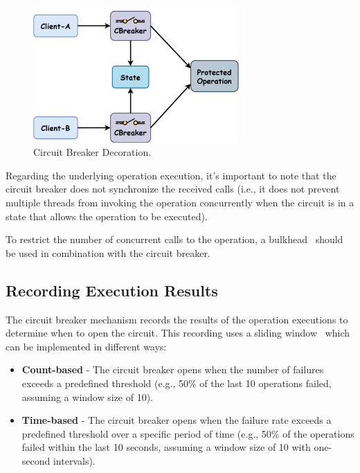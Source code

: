 \begin{figure}[!htb]
    \centering
    \includegraphics[width=0.7\textwidth]{../figures/05_cbreaker-decoration}
    \caption{Circuit Breaker Decoration.}
    \label{fig:cbreaker-decoration}
\end{figure}

Regarding the underlying operation execution,
it's important to note that the circuit breaker does not synchronize the received calls (i.e., it does not prevent multiple threads from invoking the operation concurrently when the circuit is in a state that allows the operation to be executed).

To restrict the number of concurrent calls to the operation, a bulkhead~\cite{microsoft-bulkhead-pattern} should be used in combination with the circuit breaker.

\subsection{Recording Execution Results}\label{subsec:cbreaker-recording-execution-results}

The circuit breaker mechanism records the results of the operation executions to determine when to open the circuit.
This recording uses a sliding window~\cite{sliding-window} which can be implemented in different ways:

\begin{itemize}
    \item \textbf{Count-based} -
    The circuit breaker opens when the number of failures exceeds a predefined threshold
    (e.g., 50\% of the last 10 operations failed, assuming a window size of 10).
    \item \textbf{Time-based} -
    The circuit breaker opens when the failure rate exceeds a predefined threshold over a specific period of time
    (e.g., 50\% of the operations failed within the last 10 seconds,
    assuming a window size of 10 with one-second intervals).
\end{itemize}

